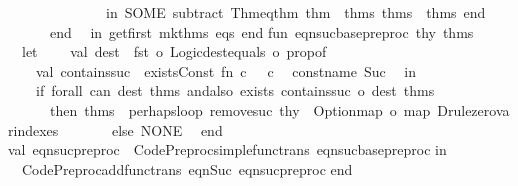 \begin{isabellebody}
\ \ \ \ \ \ \ \ \ \ \ \ \ \ in\ SOME\ {\isacharparenleft}subtract\ Thm{\isachardot}eq{\isacharunderscore}thm\ {\isacharparenleft}thm\ {\isacharcolon}{\isacharcolon}\ thms{}{\isacharparenright}\ thms\ {\isacharat}\ thms{}{\isacharparenright}\ end\isanewline
\ \ \ \ \ \ end\isanewline
\ \ in\ get{\isacharunderscore}first\ mk{\isacharunderscore}thms\ eqs\ end{\isacharsemicolon}\isanewline
\isanewline
fun\ eqn{\isacharunderscore}suc{\isacharunderscore}base{\isacharunderscore}preproc\ thy\ thms\ {\isacharequal}\isanewline
\ \ let\isanewline
\ \ \ \ val\ dest\ {\isacharequal}\ fst\ o\ Logic{\isachardot}dest{\isacharunderscore}equals\ o\ prop{\isacharunderscore}of{\isacharsemicolon}\isanewline
\ \ \ \ val\ contains{\isacharunderscore}suc\ {\isacharequal}\ exists{\isacharunderscore}Const\ {\isacharparenleft}fn\ {\isacharparenleft}c{\isacharcomma}\ {\isacharunderscore}{\isacharparenright}\ {\isacharequal}{\isachargreater}\ c\ {\isacharequal}\ %
\isaantiq
const{\isacharunderscore}name\ Suc{}%
\endisaantiq
{\isacharparenright}{\isacharsemicolon}\isanewline
\ \ in\isanewline
\ \ \ \ if\ forall\ {\isacharparenleft}can\ dest{\isacharparenright}\ thms\ andalso\ exists\ {\isacharparenleft}contains{\isacharunderscore}suc\ o\ dest{\isacharparenright}\ thms\isanewline
\ \ \ \ \ \ then\ thms\ {\isacharbar}{\isachargreater}\ perhaps{\isacharunderscore}loop\ {\isacharparenleft}remove{\isacharunderscore}suc\ thy{\isacharparenright}\ {\isacharbar}{\isachargreater}\ {\isacharparenleft}Option{\isachardot}map\ o\ map{\isacharparenright}\ Drule{\isachardot}zero{\isacharunderscore}var{\isacharunderscore}indexes\isanewline
\ \ \ \ \ \ \ else\ NONE\isanewline
\ \ end{\isacharsemicolon}\isanewline
\isanewline
val\ eqn{\isacharunderscore}suc{\isacharunderscore}preproc\ {\isacharequal}\ Code{\isacharunderscore}Preproc{\isachardot}simple{\isacharunderscore}functrans\ eqn{\isacharunderscore}suc{\isacharunderscore}base{\isacharunderscore}preproc{\isacharsemicolon}\isanewline
\isanewline
in\isanewline
\isanewline
\ \ Code{\isacharunderscore}Preproc{\isachardot}add{\isacharunderscore}functrans\ {\isacharparenleft}{\isachardoublequote}eqn{\isacharunderscore}Suc{\isachardoublequote}{\isacharcomma}\ eqn{\isacharunderscore}suc{\isacharunderscore}preproc{\isacharparenright}\isanewline
\isanewline
end{\isacharsemicolon}\isanewline
{\isacharverbatimclose}%
\endisatagML
{\isafoldML}%
%
\isadelimML
%
\endisadelimML
\isanewline
%
\isadelimtheory
\isanewline
%
\endisadelimtheory
%
\isatagtheory
{}\isamarkupfalse%
%
\endisatagtheory
{\isafoldtheory}%
%
\isadelimtheory
%
\endisadelimtheory
\end{isabellebody}%
